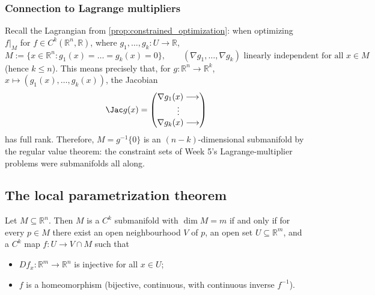 \subsubsection{Connection to Lagrange multipliers}

\begin{remark}
Recall the Lagrangian from \cref{prop:constrained_optimization}: when optimizing $f|_M$ for
$f \in C^k(\mathbb{R}^n,\mathbb{R})$, where $g_1,\dots,g_k : U \to \mathbb{R}$,
\[M := \{x \in \mathbb{R}^n : g_1(x)=\dots=g_k(x)=0\}, \qquad (\nabla g_1,\dots,\nabla g_k) \text{ linearly independent for all } x \in M\]
(hence $k \leq n$). This means precisely that, for $g : \mathbb{R}^n \to \mathbb{R}^k$,
$x \mapsto (g_1(x),\dots,g_k(x))$, the Jacobian
\[\Jac g(x) = \begin{pmatrix} \nabla g_1(x) \longrightarrow \\ \vdots \\ \nabla g_k(x) \longrightarrow \end{pmatrix}\]
has full rank. Therefore, $M = g^{-1}\{0\}$ is an $(n-k)$-dimensional submanifold by the regular
value theorem: the constraint sets of Week 5's Lagrange-multiplier problems were submanifolds all
along.
\end{remark}

\subsection{The local parametrization theorem}

\begin{theorem}
\label{thm:local_parametrization}
Let $M \subseteq \mathbb{R}^n$. Then $M$ is a $C^k$ submanifold with $\dim M = m$ if and only if
for every $p \in M$ there exist an open neighbourhood $V$ of $p$, an open set $U \subseteq
\mathbb{R}^m$, and a $C^k$ map $f : U \to V \cap M$ such that
\begin{itemize}
  \item $Df_x : \mathbb{R}^m \to \mathbb{R}^n$ is injective for all $x \in U$;
  \item $f$ is a homeomorphism (bijective, continuous, with continuous inverse $f^{-1}$).
\end{itemize}
\end{theorem}

